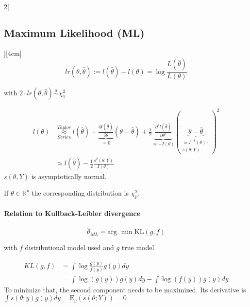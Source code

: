 \documentclass[8pt]{extarticle}
\begin{document}
\begin{multicols}{2}[\subsection{Maximum Likelihood (ML)}][4cm]
$$lr(\theta,\hat{\theta}) := l(\hat{\theta}) - l(\theta) = \log \frac{L(\hat{\theta})}{L(\theta)}$$

with $2\cdot lr(\theta,\hat{\theta}) \overset{a}{\sim} \chi^2_1$

\begin{Proof}
\vspace{-1.5em}
\begin{align*}
l(\theta) & \overset{Taylor}{\underset{Series}{\approx}} l(\hat{\theta}) + \underbrace{\frac{\partial l(\hat{\theta})}{\partial \theta}}_{=0} (\theta - \hat{\theta}) + \frac{1}{2}\underbrace{\frac{\partial^2 l(\hat{\theta})}{\partial \theta^2}}_{\approx -I(\theta)}(\underbrace{\theta - \hat{\theta}}_{\substack{\approx I^{{-}1}(\theta)\cdot\\s(\theta;Y)}})^2\\
&\approx l(\hat{\theta}) - \frac{1}{2} \frac{s^2(\theta, Y)}{I(\theta)}
\end{align*}
$s(\theta,Y)$ is asymptotically normal.
\end{Proof}

If $\theta \in \mathbb{R}^p$ the corresponding distribution is $\chi^2_p$.

\paragraph{Relation to Kullback-Leibler divergence} 

$$\hat{\theta}_{ML} = \text{arg }\min \text{KL}(g,f)$$

with $f$ distributional model used and $g$ true model

\begin{Proof}
\vspace{-1.5em}
\begin{align*}
KL(g,f) &= \int \log\frac{g(y)}{f(y)} g(y) dy\\
&= \int \log(g(y)) g(y) dy - \int \log(f(y)) g(y) dy
\end{align*}
To minimize that, the second component needs to be maximized. Its derivative is $\int s(\theta;y)g(y)dy = \mathrm{E}_g(s(\theta;Y)) = 0$
\end{Proof}
  

\end{multicols}
\end{document}
